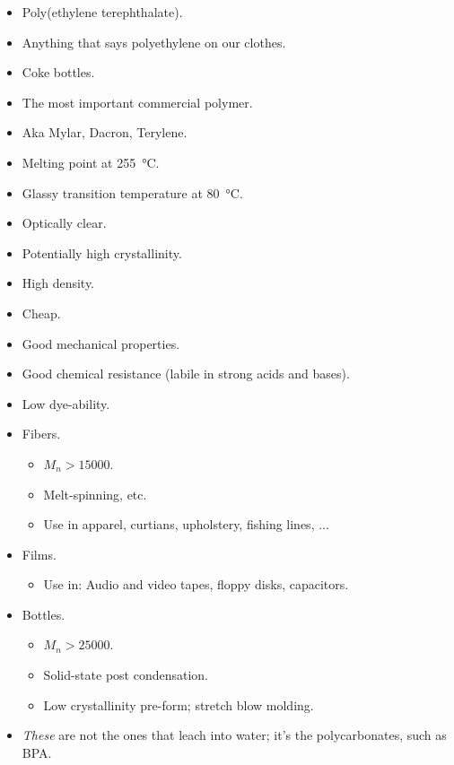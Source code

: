 \documentclass[../notes.tex]{subfiles}
\begin{document}
\begin{itemize}
\begin{itemize}
        \item Poly(ethylene terephthalate).
        \item Anything that says polyethylene on our clothes.
        \item Coke bottles.
        \item The most important commercial polymer.
        \item Aka Mylar, Dacron, Terylene.
        \item Melting point at \SI{255}{\celsius}.
        \item Glassy transition temperature at \SI{80}{\celsius}.
        \item Optically clear.
        \item Potentially high crystallinity.
        \item High density.
        \item Cheap.
        \item Good mechanical properties.
        \item Good chemical resistance (labile in strong acids and bases).
        \item Low dye-ability.
        \item Fibers.
        \begin{itemize}
            \item $M_n>\num{15000}$.
            \item Melt-spinning, etc.
            \item Use in apparel, curtians, upholstery, fishing lines, ...
        \end{itemize}
        \item Films.
        \begin{itemize}
            \item Use in: Audio and video tapes, floppy disks, capacitors.
        \end{itemize}
        \item Bottles.
        \begin{itemize}
            \item $M_n>\num{25000}$.
            \item Solid-state post condensation.
            \item Low crystallinity pre-form; stretch blow molding.
        \end{itemize}
        \item \emph{These} are not the ones that leach into water; it's the polycarbonates, such as BPA.
    \end{itemize}

\end{itemize}
\end{document}
